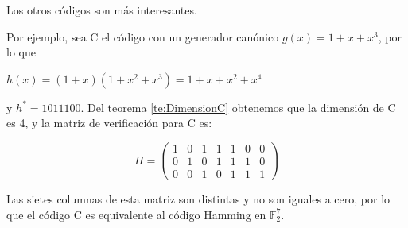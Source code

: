 \documentclass{beamer}
\theoremstyle{plain}
\theoremstyle{example}
\theoremstyle{example}
\begin{document}
\begin{frame}  \small  

Los otros códigos son más interesantes. \\
\vspace*{5pt}


Por ejemplo, sea C el código con un generador canónico $g(x) = 1 + x + x^3$, por lo que 

\begin{center}
$h(x)=(1+x)(1+x^2 +x^3)=1+x+x^2 +x^4$
\end{center}

y $h^* = 1011100$. Del teorema \ref{te:DimensionC} obtenemos que la dimensión de C es 4, y la matriz de verificación para C es:


\[
    H =   \left( \begin{array}{ccccccc}
     				  1 &  0  & 1  & 1 & 1  & 0  & 0\\ 
					  0 &  1  & 0	&  1 & 1 &	 1  & 0\\ 
					  0 &  0  & 1  &  0 & 1 & 1  & 1
           			\end{array}
    		\right) 	    		
\]

Las sietes columnas de esta matriz son distintas y no son iguales a cero, por lo que el código C es equivalente al código Hamming en $\mathbb{F}_2^7$.

\end{frame} 
\end{document}
